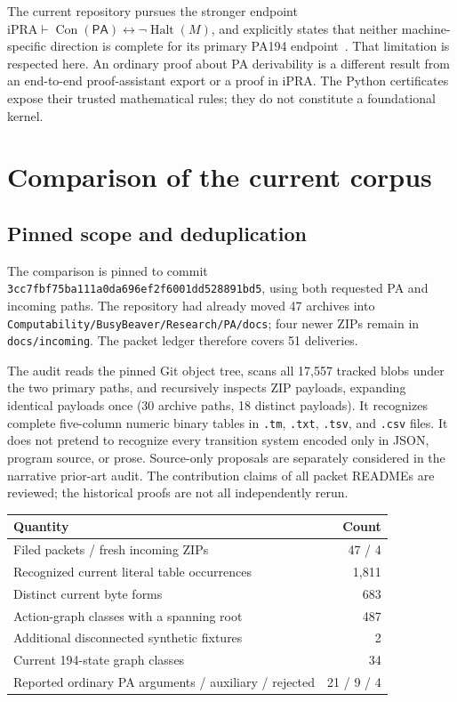 \documentclass[10pt,letterpaper]{article}
\newcommand{\PA}{\mathsf{PA}}
\newcommand{\Con}{\operatorname{Con}}
\newcommand{\Halt}{\operatorname{Halt}}
\newcommand{\file}[1]{\nolinkurl{#1}}
\begin{document}
The current repository pursues the stronger endpoint
\(\mathrm{iPRA}\vdash\Con(\PA)\leftrightarrow\neg\Halt(M)\), and explicitly
states that neither machine-specific direction is complete for its primary
PA194 endpoint~\cite{repo}. That limitation is respected here. An ordinary proof about
PA derivability is a different result from an end-to-end proof-assistant
export or a proof in iPRA. The Python certificates expose their trusted
mathematical rules; they do not constitute a foundational kernel.

\section{Comparison of the current corpus}\label{sec:comparison}

\subsection{Pinned scope and deduplication}

The comparison is pinned to commit
\texttt{3cc7fbf75ba111a0da696ef2f6001dd528891bd5}, using both requested PA
and incoming paths. The repository had already moved 47 archives into
\file{Computability/BusyBeaver/Research/PA/docs}; four newer ZIPs remain in
\file{docs/incoming}. The packet ledger therefore covers 51 deliveries.

The audit reads the pinned Git object tree, scans all 17,557 tracked blobs
under the two primary paths, and recursively inspects ZIP payloads, expanding
identical payloads once (30 archive paths, 18 distinct payloads). It
recognizes complete five-column numeric binary tables in \file{.tm},
\file{.txt}, \file{.tsv}, and \file{.csv} files. It does not pretend to
recognize every transition system encoded only in JSON, program source,
or prose. Source-only proposals are separately considered in the narrative
prior-art audit. The contribution claims of all packet READMEs are reviewed;
the historical proofs are not all independently rerun.

\begin{center}
\begin{tabular}{lr}
\toprule
Quantity & Count\\\midrule
Filed packets / fresh incoming ZIPs & 47 / 4\\
Recognized current literal table occurrences & 1,811\\
Distinct current byte forms & 683\\
Action-graph classes with a spanning root & 487\\
Additional disconnected synthetic fixtures & 2\\
Current 194-state graph classes & 34\\
Reported ordinary PA arguments / auxiliary / rejected & 21 / 9 / 4\\
\bottomrule
\end{tabular}
\end{center}
\end{document}
